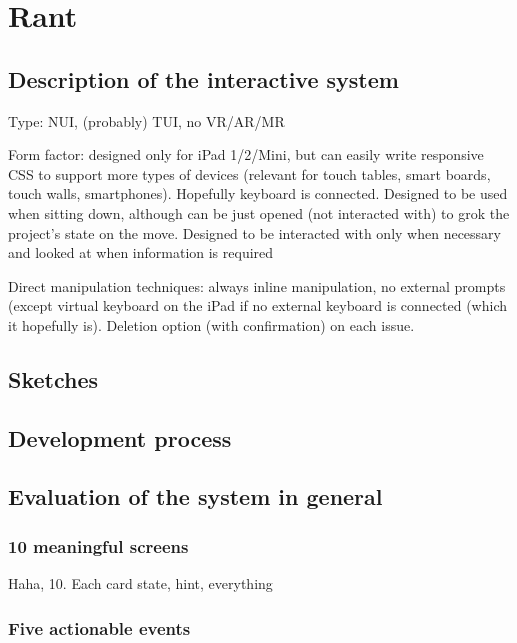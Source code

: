 \section{Rant}

\subsection{Description of the interactive system}

Type: NUI, (probably) TUI, no VR/AR/MR %

Form factor: designed only for iPad 1/2/Mini, but can easily write responsive CSS to support more types of devices (relevant for touch tables, smart boards, touch walls, smartphones). Hopefully keyboard is connected. Designed to be used when sitting down, although can be just opened (not interacted with) to grok the project's state on the move. Designed to be interacted with only when necessary and looked at when information is required

Direct manipulation techniques: always inline manipulation, no external prompts (except virtual keyboard on the iPad if no external keyboard is connected (which it hopefully is). Deletion option (with confirmation) on each issue.

\subsection{Sketches}

\subsection{Development process}

\subsection{Evaluation of the system in general}

\subsubsection{10 meaningful screens}

Haha, 10. Each card state, hint, everything


\subsubsection{Five actionable events}

